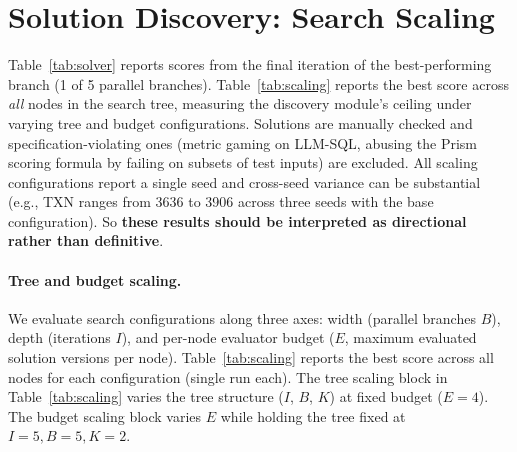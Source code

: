 
\section{Solution Discovery: Search Scaling}
\label{sec:app:discovery-scaling}

Table~\ref{tab:solver} reports \sys{} scores from the final iteration of the best-performing branch (1 of 5 parallel branches).
Table~\ref{tab:scaling} reports the best score across \emph{all} nodes in the search tree, measuring the discovery module's ceiling under varying tree and budget configurations. Solutions are manually checked and specification-violating ones (metric gaming on LLM-SQL, abusing the Prism scoring formula by failing on subsets of test inputs) are excluded. All scaling configurations report a single seed and cross-seed variance can be substantial (e.g., TXN ranges from 3636 to 3906 across three seeds with the base configuration). So \textbf{these results should be interpreted as directional rather than definitive}.


\paragraph{Tree and budget scaling.}
We evaluate search configurations along three axes: width (parallel branches $B$), depth (iterations $I$), and per-node evaluator budget ($E$, maximum evaluated solution versions per node).
Table~\ref{tab:scaling} reports the best score across all nodes for each configuration (single run each).
The tree scaling block in Table~\ref{tab:scaling} varies the tree structure ($I$, $B$, $K$) at fixed budget ($E\!=\!4$). The budget scaling block varies $E$ while holding the tree fixed at $I\!=\!5, B\!=\!5, K\!=\!2$.

